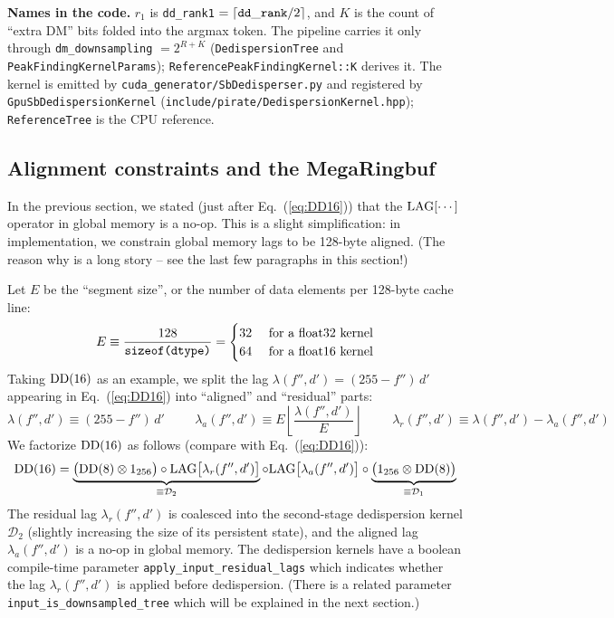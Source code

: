 \documentclass{article}
\numberwithin{equation}{section}   %
\def\DD{{\rm DD}}
\def\LAG{{\rm LAG}}
\begin{document}
{\bf Names in the code.} $r_1$ is {\tt dd\_rank1} $= \lceil {\tt dd\_rank}/2 \rceil$, and $K$ is
the count of ``extra DM'' bits folded into the argmax token. The pipeline carries it only
through {\tt dm\_downsampling} $= 2^{R+K}$ ({\tt DedispersionTree} and
{\tt PeakFindingKernelParams}); {\tt ReferencePeakFindingKernel::K} derives it.
The kernel is emitted by {\tt cuda\_generator/SbDedisperser.py} and registered by
{\tt GpuSbDedispersionKernel} ({\tt include/pirate/DedispersionKernel.hpp});
{\tt ReferenceTree} is the CPU reference.

\subsection{Alignment constraints and the MegaRingbuf}
\label{ssec:dd_alignment}

In the previous section, we stated (just after Eq.\ (\ref{eq:DD16})) that the $\LAG[\cdots]$
operator in global memory is a no-op.
This is a slight simplification: in implementation, we constrain global memory lags to be
128-byte aligned.
(The reason why is a long story -- see the last few paragraphs in this section!)

Let $E$ be the ``segment size'', or the number of data elements per 128-byte cache line:
\begin{equation}
E \equiv \frac{128}{\mbox{\tt sizeof(dtype)}} = \begin{cases}
 32 & \mbox{ for a float32 kernel} \\
 64 & \mbox{ for a float16 kernel}
\end{cases}
\end{equation}
Taking $\DD(16)$ as an example, we split the lag $\lambda(f'',d') = (255-f'') \, d'$ 
appearing in Eq.\ (\ref{eq:DD16}) into ``aligned'' and ``residual'' parts:
\begin{equation}
\lambda(f'',d') \equiv (255-f'') \, d'
  \hspace{1cm}
\lambda_a(f'',d') \equiv E \left\lfloor \frac{\lambda(f'',d')}{E} \right\rfloor
  \hspace{1cm}
\lambda_r(f'',d') \equiv \lambda(f'',d') - \lambda_a(f'',d')
\label{eq:DD16_align}
\end{equation}
We factorize $\DD(16)$ as follows (compare with Eq.\ (\ref{eq:DD16})):
\begin{equation}
\DD(16) =
\underbrace{\big( \DD(8) \otimes 1_{256} \big) 
            \circ \LAG\big[ \lambda_r(f'',d') \big] }_{\equiv {\mathcal D}_2}
   \circ \LAG\big[ \lambda_a(f'',d') \big]
   \circ \underbrace{\big( 1_{256} \otimes \DD(8) \big)}_{\equiv {\mathcal D}_1}
\label{eq:DD16b}
\end{equation}
The residual lag $\lambda_r(f'',d')$ is coalesced into the second-stage
dedispersion kernel ${\mathcal D}_2$ (slightly increasing the size of its persistent
state), and the aligned lag $\lambda_a(f'',d')$ is a no-op in global memory.
The dedispersion kernels have a boolean compile-time parameter \verb|apply_input_residual_lags|
which indicates whether the lag $\lambda_r(f'',d')$ is applied before dedispersion.
(There is a related parameter \verb|input_is_downsampled_tree| which will be explained in
the next section.)
\end{document}
